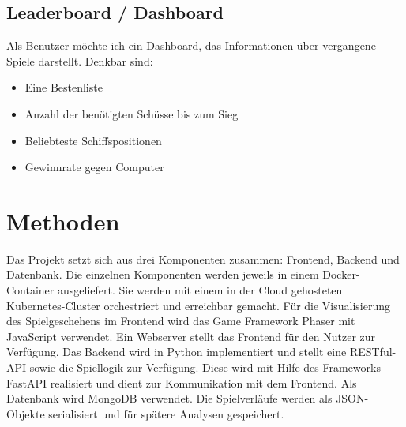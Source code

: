 \documentclass[a4paper, 10pt, conference]{IEEEtran}
\begin{document}
\subsection{Leaderboard / Dashboard}
Als Benutzer möchte ich ein Dashboard, das Informationen über vergangene Spiele darstellt. Denkbar sind:
\begin{itemize}
	\item Eine Bestenliste
	\item Anzahl der benötigten Schüsse bis zum Sieg
	\item Beliebteste Schiffspositionen
	\item Gewinnrate gegen Computer
\end{itemize}


\section{Methoden}\label{sec:methoden}

Das Projekt setzt sich aus drei Komponenten zusammen: Frontend, Backend und Datenbank.
Die einzelnen Komponenten werden jeweils in einem Docker-Container ausgeliefert.
Sie werden mit einem in der Cloud gehosteten Kubernetes-Cluster orchestriert und erreichbar gemacht.
Für die Visualisierung des Spielgeschehens im Frontend wird das Game Framework Phaser mit JavaScript verwendet. 
Ein Webserver stellt das Frontend für den Nutzer zur Verfügung.
Das Backend wird in Python implementiert und stellt eine RESTful-API sowie die Spiellogik zur Verfügung.
Diese wird mit Hilfe des Frameworks FastAPI realisiert und dient zur Kommunikation mit dem Frontend.
Als Datenbank wird MongoDB verwendet. Die Spielverläufe werden als JSON-Objekte serialisiert und für spätere Analysen gespeichert.

\printbibliography
\end{document}
